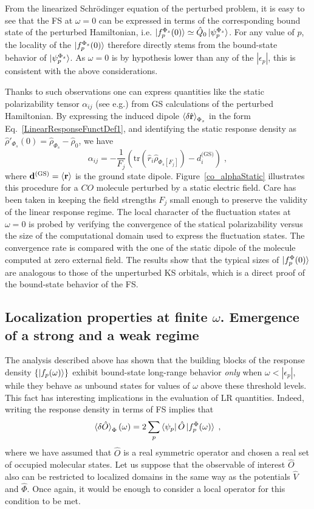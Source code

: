 \documentclass[reprint,aps,prb]{revtex4-1}
\newcommand{\eps}{\epsilon}
\newcommand{\be}{\begin{equation}}
\newcommand{\ee}{\end{equation}}
\newcommand{\lb}{\label}
\newcommand{\op}[1]{\hat {#1}}
\newcommand{\trace}[1]{\mathrm{tr}\left(#1\right)}
\newcommand{\dmnot}{\op{\rho}_0}
\newcommand{\dm}{\op{\rho}}
\begin{document}
From the linearized Schr\"odinger equation of the perturbed problem, it is easy to see that the FS at $\omega=0$ can be expressed
in terms of the corresponding bound state of the perturbed Hamiltonian, i.e.
$\ket{f_p^{\Phi_s}(0)} \simeq \op Q_0 \ket{\psi_p^{\Phi_s}}$.
For any value of $p$, the locality of the $\ket{f_p^{\Phi_s}(0)}$ therefore directly stems from the
bound-state behavior of $\ket{\psi_p^{\Phi_s}}$. As $\omega=0$ is by hypothesis
lower than any of the $|\eps_p|$, this is consistent with the above considerations.

Thanks to such observations one can express quantities like the static polarizability tensor $\alpha_{ij}$ (see e.g.\cite{DebElecField}) from GS calculations of the perturbed Hamiltonian.
By expressing the induced dipole $\braket{\delta \op{\mathbf r}}_{\Phi_s}$ in the form Eq.~\eqref{LinearResponseFunctDef1}, and identifying the static response density as $\dm'_{\Phi_s}(0) = \dm_{\Phi_s} -\dmnot $, we have
\be \label{staticalpha}
\alpha_{ij} =
-\frac{1}{F_j} \left(\trace{\op r_i \dm_{\Phi_s[F_j]}} - d^{\text{(GS)}}_i \right)\;,
\ee
where $\mathbf d^\text{(GS)}=\braket{\mathbf r}$ is the ground state dipole.
Figure~\ref{co_alphaStatic} illustrates this procedure for a $CO$ molecule
perturbed by a static electric field.
Care has been taken in keeping the field strengths $F_j$ small enough to
preserve the validity of the linear response regime.
The local character of the fluctuation states at $\omega=0$ is
probed by verifying the convergence of the statical polarizability versus
the size of the computational domain used to express the fluctuation states. The convergence rate is compared with the
one of the static dipole of the molecule computed at zero external field.
The results show that the typical sizes of $\ket{f^\Phi_p(0)}$ are analogous to those of the unperturbed KS orbitals, which is a direct proof of the bound-state behavior of the FS.

\subsection{Localization properties at finite $\omega$. Emergence of a strong and a weak regime}

The analysis described above has shown that the building blocks of the response density $\{\ket{f_p(\omega)}\}$
exhibit bound-state long-range behavior \emph{only} when $\omega < |\eps_p|$,
while they behave as unbound states for values of $\omega$ above these threshold levels.
This fact has interesting implications in the evaluation of LR quantities. Indeed, writing the response
density in terms of FS implies that
\be\lb{LinearResponseFunctDef2}
\braket{\delta\op O}_\Phi(\omega) = 2 \sum_p\bra{\psi_p}\op O\ket{f_p^\Phi(\omega)}  \;,
\ee
where we have assumed that $\op O$ is a real symmetric operator and chosen a real set of occupied molecular states.
Let us suppose that the observable of interest $\op O$ also can be restricted to localized domains in the same way as the potentials $ \op V$ and $\op \Phi$.
Once again, it would be enough to consider a local operator for this condition to be met.
\end{document}
